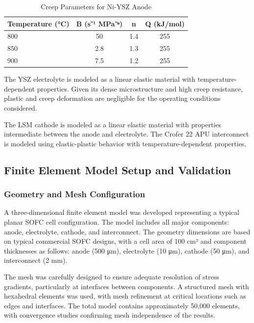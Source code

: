 \documentclass[conference]{IEEEtran}
\begin{document}
\begin{table}[htbp]
\caption{Creep Parameters for Ni-YSZ Anode}
\label{tab:creep_parameters}
\centering
\begin{tabular}{lccc}
\toprule
\textbf{Temperature (°C)} & \textbf{B (s⁻¹ MPa⁻ⁿ)} & \textbf{n} & \textbf{Q (kJ/mol)} \\
\midrule
800 & 50 & 1.4 & 255 \\
850 & 2.8 & 1.3 & 255 \\
900 & 7.5 & 1.2 & 255 \\
\bottomrule
\end{tabular}
\end{table}

The YSZ electrolyte is modeled as a linear elastic material with temperature-dependent properties. Given its dense microstructure and high creep resistance, plastic and creep deformation are negligible for the operating conditions considered.

The LSM cathode is modeled as a linear elastic material with properties intermediate between the anode and electrolyte. The Crofer 22 APU interconnect is modeled using elastic-plastic behavior with temperature-dependent properties.

\subsection{Finite Element Model Setup and Validation}

\subsubsection{Geometry and Mesh Configuration}

A three-dimensional finite element model was developed representing a typical planar SOFC cell configuration. The model includes all major components: anode, electrolyte, cathode, and interconnect. The geometry dimensions are based on typical commercial SOFC designs, with a cell area of 100 cm² and component thicknesses as follows: anode (500 μm), electrolyte (10 μm), cathode (50 μm), and interconnect (2 mm).

The mesh was carefully designed to ensure adequate resolution of stress gradients, particularly at interfaces between components. A structured mesh with hexahedral elements was used, with mesh refinement at critical locations such as edges and interfaces. The total model contains approximately 50,000 elements, with convergence studies confirming mesh independence of the results.
\end{document}
